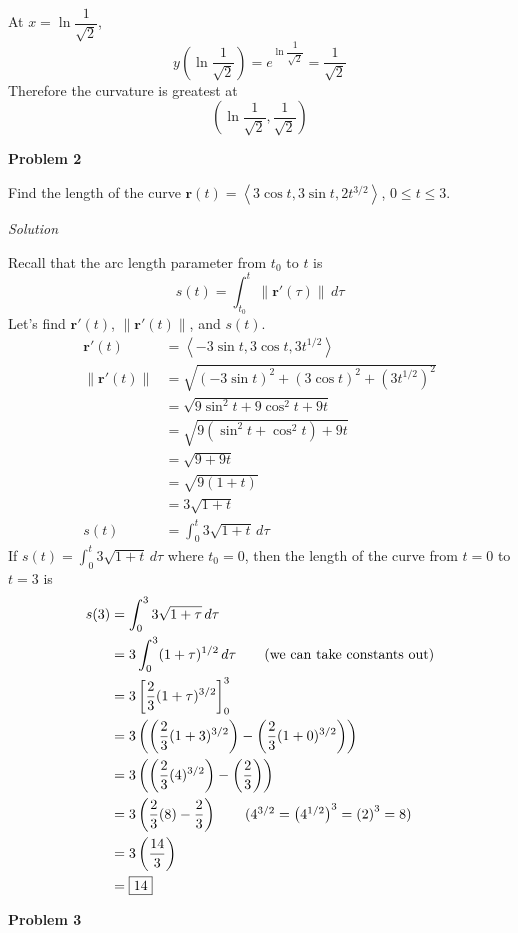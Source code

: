 \documentclass{article}
\newcommand{\lrp}[1]{\left( #1 \right)}
\newcommand{\lra}[1]{\left\langle #1 \right\rangle}
\newcommand{\lrb}[1]{\left[ #1 \right]}
\newcommand{\norm}[1]{\left\lVert #1 \right\rVert}
\renewcommand{\r}[0]{\mathbf{r}}
\newcommand{\Solution}{\textit{Solution}}
\begin{document}
At $x=\ln\dfrac{1}{\sqrt{2}}$,
\begin{equation*}
    y\lrp{\ln\dfrac{1}{\sqrt{2}}}=e^{\ln\dfrac{1}{\sqrt{2}}}=\frac{1}{\sqrt{2}}\tag{$e$ and $\ln$ ``cancel"}
\end{equation*}
Therefore the curvature is greatest at 
\begin{equation*}
    \boxed{\lrp{\ln\dfrac{1}{\sqrt{2}},\dfrac{1}{\sqrt{2}}}}
\end{equation*}
{}\textbf{Problem 2}

Find the length of the curve $\r(t)=\lra{3\cos t, 3\sin t, 2t^{3/2}}$, $0\leq t\leq 3$.

\Solution

Recall that the arc length parameter from $t_0$ to $t$ is
\begin{equation*}
    s(t)=\int_{t_0}^t\norm{\r'(\tau)}\,d\tau
\end{equation*}
Let's find $\r'(t)$, $\norm{\r'(t)}$, and $s(t)$.
\begin{align*}
    \r'(t)&=\lra{-3\sin t,3\cos t, 3t^{1/2}}\\
    \norm{\r'(t)}&=\sqrt{(-3\sin t)^2+(3\cos t)^2 +\lrp{3t^{1/2}}^2}\\
    &=\sqrt{9\sin^2 t+9\cos^2t+9t}\\
    &=\sqrt{9\lrp{\sin^2 t +\cos^2 t}+9t}\\
    &=\sqrt{9+9t}\tag{$\sin^2t+\cos^2t=1$}\\
    &=\sqrt{9(1+t)}\\
    &=3\sqrt{1+t}\\
    s(t)&=\int_0^t 3\sqrt{1+t}\,d\tau\tag{we know $0\leq t\leq 3$, so let $t_0=0$}
\end{align*}
If $\displaystyle s(t)=\int_0^t3\sqrt{1+t}\,d\tau$ where $t_0=0$, then the length of the curve from $t=0$ to $t=3$ is
\begin{align*}
    s(3)&=\int_0^3 3\sqrt{1+\tau}\,d\tau\\
    &=3\int_0^3 (1+\tau)^{1/2}\,d\tau\tag{we can take constants out}\\
    &=3\lrb{\frac{2}{3}(1+\tau)^{3/2}}_0^3\\
    &=3\lrp{\lrp{\frac{2}{3}(1+3)^{3/2}}-\lrp{\frac{2}{3}(1+0)^{3/2}}}\\
    &=3\lrp{\lrp{\frac{2}{3}(4)^{3/2}}-\lrp{\frac{2}{3}}}\\
    &=3\lrp{\frac{2}{3}(8)-\frac{2}{3}}\tag{$4^{3/2}=\lrp{4^{1/2}}^3=\lrp{2}^3=8$}\\
    &=3\lrp{\frac{14}{3}}\\
    &=\boxed{14}
\end{align*}
{}\textbf{Problem 3}
\end{document}
